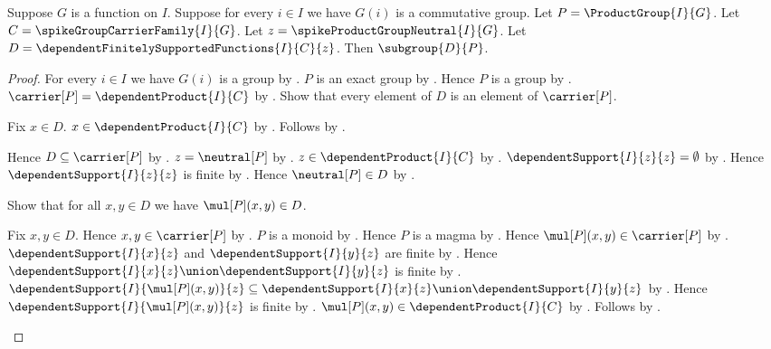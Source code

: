 \begin{theorem}\label{spike_direct_sum_group_subgroup}
    Suppose $G$ is a function on $I$.
    Suppose for every $i\in I$ we have $G(i)$ is a commutative group.
    Let $P=\ProductGroup{I}{G}$.
    Let $C=\spikeGroupCarrierFamily{I}{G}$.
    Let $z=\spikeProductGroupNeutral{I}{G}$.
    Let $D=\dependentFinitelySupportedFunctions{I}{C}{z}$.
    Then $\subgroup{D}{P}$.
\end{theorem}
\begin{proof}
    For every $i\in I$ we have $G(i)$ is a group by
        .
    $P$ is an exact group by .
    Hence $P$ is a group by \auto.
    $\carrier[P]=\dependentProduct{I}{C}$ by
        .
    Show that every element of $D$ is an element of $\carrier[P]$.
    \begin{subproof}
        Fix $x\in D$.
        $x\in\dependentProduct{I}{C}$ by
            .
        Follows by \auto.
    \end{subproof}
    Hence $D\subseteq\carrier[P]$ by .
    $z=\neutral[P]$ by .
    $z\in\dependentProduct{I}{C}$ by
        .
    $\dependentSupport{I}{z}{z}=\emptyset$ by
        .
    Hence $\dependentSupport{I}{z}{z}$ is finite by
        .
    Hence $\neutral[P]\in D$ by
        .

    Show that for all $x,y\in D$ we have $\mul[P](x,y)\in D$.
    \begin{subproof}
        Fix $x,y\in D$.
        Hence $x,y\in\carrier[P]$ by .
        $P$ is a monoid by .
        Hence $P$ is a magma by .
        Hence $\mul[P](x,y)\in\carrier[P]$ by
            .
        $\dependentSupport{I}{x}{z}$ and
            $\dependentSupport{I}{y}{z}$ are finite by
            .
        Hence
            $\dependentSupport{I}{x}{z}\union
                \dependentSupport{I}{y}{z}$ is finite by
            .
        $\dependentSupport{I}{\mul[P](x,y)}{z}
            \subseteq
            \dependentSupport{I}{x}{z}\union
                \dependentSupport{I}{y}{z}$ by
            .
        Hence $\dependentSupport{I}{\mul[P](x,y)}{z}$ is finite by
            .
        $\mul[P](x,y)\in\dependentProduct{I}{C}$ by \auto.
        Follows by
            .
    \end{subproof}


\end{proof}
